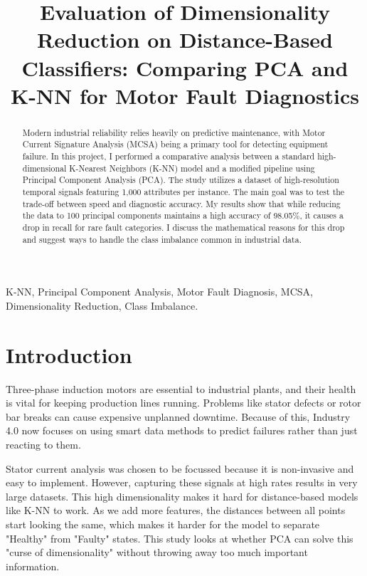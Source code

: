 \documentclass[conference]{IEEEtran}
\begin{document}
\title{Evaluation of Dimensionality Reduction on Distance-Based Classifiers: Comparing PCA and K-NN for Motor Fault Diagnostics}

\author{
}

\maketitle

\begin{abstract}
Modern industrial reliability relies heavily on predictive maintenance, with Motor Current Signature Analysis (MCSA) being a primary tool for detecting equipment failure. In this project, I performed a comparative analysis between a standard high-dimensional K-Nearest Neighbors (K-NN) model and a modified pipeline using Principal Component Analysis (PCA). The study utilizes a dataset of high-resolution temporal signals featuring 1,000 attributes per instance. The main goal was to test the trade-off between speed and diagnostic accuracy. My results show that while reducing the data to 100 principal components maintains a high accuracy of 98.05\%, it causes a drop in recall for rare fault categories. I discuss the mathematical reasons for this drop and suggest ways to handle the class imbalance common in industrial data.
\end{abstract}

\begin{IEEEkeywords}
K-NN, Principal Component Analysis, Motor Fault Diagnosis, MCSA, Dimensionality Reduction, Class Imbalance.
\end{IEEEkeywords}

\section{Introduction}
Three-phase induction motors are essential to industrial plants, and their health is vital for keeping production lines running. Problems like stator defects or rotor bar breaks can cause expensive unplanned downtime. Because of this, Industry 4.0 now focuses on using smart data methods to predict failures rather than just reacting to them.



Stator current analysis was chosen to be focussed because it is non-invasive and easy to implement. However, capturing these signals at high rates results in very large datasets. This high dimensionality makes it hard for distance-based models like K-NN to work. As we add more features, the distances between all points start looking the same, which makes it harder for the model to separate "Healthy" from "Faulty" states. This study looks at whether PCA can solve this "curse of dimensionality" without throwing away too much important information.
\end{document}
